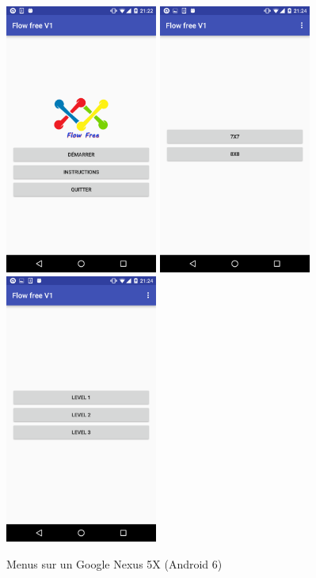 \documentclass[12pt, a4paper]{article}%
\begin{document}
	\begin{figure}
	\includegraphics[width=5cm]{Images/nexus_1.png}\hfill
	\includegraphics[width=5cm]{Images/nexus_3.png}\hfill
	\includegraphics[width=5cm]{Images/nexus_4.png}
	\caption{Menus sur un Google Nexus 5X (Android 6)}\label{fig:menus}
\end{figure}
\end{document}
